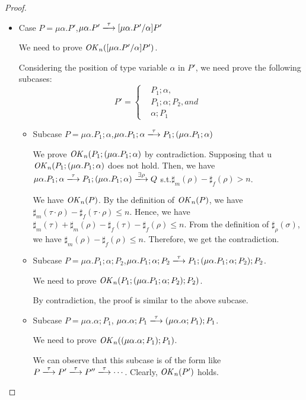 \begin{proof}
\begin{itemize}
 \item Case  \(P = \mu\alpha.P'\),\Rtab  \( \mu\alpha.P' \xlongrightarrow{\tau} [\mu\alpha.P'\slash\alpha]P'\)

   We need to prove \(\mathit{OK}_n([\mu\alpha.P'\slash\alpha]P')\).

   Considering the position of type variable \(\alpha\) in \(P'\), we need prove the following subcases:
$$
   P'=\left\{
   \begin{aligned}
     &P_1;\alpha,& \\
     &P_1;\alpha;P_2, and&  \\
     &\alpha;P_1&
   \end{aligned}
   \right.
$$

   \begin{itemize}
   \item Subcase \(P = \mu\alpha.P_1;\alpha\),\Rtab \(
     \mu\alpha.P_1;\alpha \xlongrightarrow{\tau} P_1;(\mu\alpha.P_1;\alpha) \)
     
     We prove \(\mathit{OK}_n(P_1;(\mu\alpha.P_1;\alpha) \) by
     contradiction. Supposing that u\(\mathit{OK}_n(P_1;(\mu\alpha.P_1;\alpha)
     \) does not hold. Then, we have \( \mu\alpha.P_1;\alpha
     \xlongrightarrow{\tau} P_1;(\mu\alpha.P_1;\alpha)
     \xlongrightarrow{\exists \rho}Q\) s.t.\(\sharp_m(\rho) -
     \sharp_f(\rho) > n\).

     We have \(\mathit{OK}_n(P)\).  By the definition of \(\mathit{OK}_n(P)\), we
     have \(\sharp_m(\tau \cdot \rho) -\sharp_f(\tau \cdot \rho) \le
     n\). Hence, we have \(\sharp_m(\tau) + \sharp_m(\rho) -
     \sharp_f(\tau) -\sharp_f(\rho) \le n\).  From the definition of
     \(\sharp_\rho(\sigma)\), we have \(\sharp_m(\rho) -\sharp_f(\rho)
  \le n\). Therefore, we get the contradiction.

\item Subcase  \(P = \mu\alpha.P_1;\alpha;P_2\),\Rtab \(\mu\alpha.P_1;\alpha;P_2 \xlongrightarrow{\tau} P_1;(\mu\alpha.P_1;\alpha;P_2);P_2 \).

  We need to prove  \(\mathit{OK}_n(P_1;(\mu\alpha.P_1;\alpha;P_2);P_2) \).

  By contradiction, the proof is similar to the above subcase.

     \item Subcase \(P = \mu\alpha.\alpha;P_1\),\Rtab
       \(\mu\alpha.\alpha;P_1 \xlongrightarrow{\tau}
       (\mu\alpha.\alpha;P_1);P_1 \).

       We need to prove \(\mathit{OK}_n((\mu\alpha.\alpha;P_1);P_1)\).

       We can observe that this subcase is of the form like
       \(P\xlongrightarrow{\tau}P'\xlongrightarrow{\tau}P''\xlongrightarrow{\tau}
       \cdots\). Clearly, \(\mathit{OK}_n(P')\) holds.

     \end{itemize}

\end{itemize}
\end{proof}

